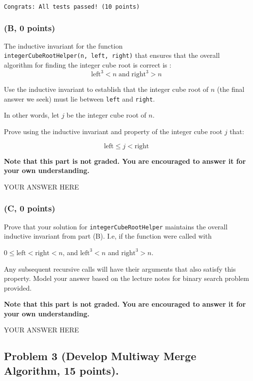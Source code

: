 \documentclass[
]{article}
\begin{document}
\begin{verbatim}
Congrats: All tests passed! (10 points)
\end{verbatim}

\hypertarget{b-0-points}{%
\subsubsection{(B, 0 points)}\label{b-0-points}}

The inductive invariant for the function
\texttt{integerCubeRootHelper(n,\ left,\ right)} that ensures that the
overall algorithm for finding the integer cube root is correct is :
\[\text{left}^3 < n\; \text{and}\; \text{right}^3 > n\]

Use the inductive invariant to establish that the integer cube root of
\(n\) (the final answer we seek) must lie between \texttt{left} and
\texttt{right}.

In other words, let \(j\) be the integer cube root of \(n\).

Prove using the inductive invariant and property of the integer cube
root \(j\) that:

\[ \text{left} \leq j  < \text{right}\]

\textbf{Note that this part is not graded. You are encouraged to answer
it for your own understanding.}

YOUR ANSWER HERE

\hypertarget{c-0-points}{%
\subsubsection{(C, 0 points)}\label{c-0-points}}

Prove that your solution for \texttt{integerCubeRootHelper} maintains
the overall inductive invariant from part (B). I.e, if the function were
called with

\(0 \leq \text{left} < \text{right} < n\), and \(\text{left}^3 < n\) and
\(\text{right}^3 > n\).

Any subsequent recursive calls will have their arguments that also
satisfy this property. Model your answer based on the lecture notes for
binary search problem provided.

\textbf{Note that this part is not graded. You are encouraged to answer
it for your own understanding.}

YOUR ANSWER HERE

\hypertarget{problem-3-develop-multiway-merge-algorithm-15-points}{%
\subsection{Problem 3 (Develop Multiway Merge Algorithm, 15
points).}\label{problem-3-develop-multiway-merge-algorithm-15-points}}
\end{document}
